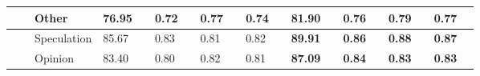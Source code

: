 \begin{table}[!tbh]
{\begin{tabular}{l|l|l|llllllll||llllllll}
                       &                                 & Other                   & \multicolumn{1}{l|}{76.95} & \multicolumn{1}{l|}{}                       & \multicolumn{1}{l|}{0.72} & \multicolumn{1}{l|}{}                      & \multicolumn{1}{l|}{0.77} & \multicolumn{1}{l|}{}                      & \multicolumn{1}{l|}{0.74} &                       & \multicolumn{1}{l|}{81.90} & \multicolumn{1}{l|}{}                       & \multicolumn{1}{l|}{0.76} & \multicolumn{1}{l|}{}                      & \multicolumn{1}{l|}{0.79} & \multicolumn{1}{l|}{}                      & \multicolumn{1}{l|}{0.77} &                       \\ 
\midrule
&                                  & Speculation              & \multicolumn{1}{l|}{85.67} & \multicolumn{1}{l|}{}                        & \multicolumn{1}{l|}{0.83} & \multicolumn{1}{l|}{}                       & \multicolumn{1}{l|}{0.81} & \multicolumn{1}{l|}{}                       & \multicolumn{1}{l|}{0.82} &                        & \multicolumn{1}{l|}{\cellcolor[HTML]{FFFE65}\textbf{89.91}} & \multicolumn{1}{l|}{\cellcolor[HTML]{FFFE65}}                                 & \multicolumn{1}{l|}{\cellcolor[HTML]{FFFE65}\textbf{0.86}} & \multicolumn{1}{l|}{\cellcolor[HTML]{FFFE65}}                                & \multicolumn{1}{l|}{\cellcolor[HTML]{FFFE65}\textbf{0.88}} & \multicolumn{1}{l|}{\cellcolor[HTML]{FFFE65}}                                & \multicolumn{1}{l|}{\cellcolor[HTML]{FFFE65}\textbf{0.87}} & \cellcolor[HTML]{FFFE65}                                \\ \cline{3-4} \cline{6-6} \cline{8-8} \cline{10-10} \cline{12-12} \cline{14-14} \cline{16-16} \cline{18-18}
                                                                                               &                                  & Opinion                  & \multicolumn{1}{l|}{83.40} & \multicolumn{1}{l|}{}                        & \multicolumn{1}{l|}{0.80} & \multicolumn{1}{l|}{}                       & \multicolumn{1}{l|}{0.82} & \multicolumn{1}{l|}{}                       & \multicolumn{1}{l|}{0.81} &                        & \multicolumn{1}{l|}{\cellcolor[HTML]{FFFE65}\textbf{87.09}} & \multicolumn{1}{l|}{\cellcolor[HTML]{FFFE65}}                                 & \multicolumn{1}{l|}{\cellcolor[HTML]{FFFE65}\textbf{0.84}} & \multicolumn{1}{l|}{\cellcolor[HTML]{FFFE65}}                                & \multicolumn{1}{l|}{\cellcolor[HTML]{FFFE65}\textbf{0.83}} & \multicolumn{1}{l|}{\cellcolor[HTML]{FFFE65}}                                & \multicolumn{1}{l|}{\cellcolor[HTML]{FFFE65}\textbf{0.83}} & \cellcolor[HTML]{FFFE65}                                \\ \cline{3-4} \cline{6-6} \cline{8-8} \cline{10-10} \cline{12-12} \cline{14-14} \cline{16-16} \cline{18-18}

\end{tabular}}
\end{table}
